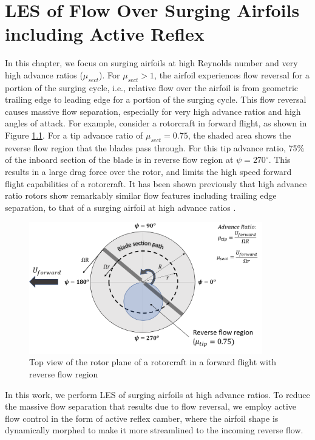 \chapter{LES of Flow Over Surging Airfoils including Active Reflex}

In this chapter, we focus on surging airfoils at high Reynolds number and very high advance ratios ($\mu_{sect}$). For $\mu_{sect}>1$, the airfoil experiences flow reversal for a portion of the surging cycle, i.e., relative flow over the airfoil is from geometric trailing edge to leading edge for a portion of the surging cycle.
This flow reversal causes massive flow separation, especially for very high advance ratios and high angles of attack. 
For example, consider a rotorcraft in forward flight, as shown in Figure \ref{fig:forward_flight_schematic}.
For a tip advance ratio of $\mu_{sect} = 0.75$, the shaded area shows the reverse flow region that the blades pass through.
For this tip advance ratio, 75\% of the inboard section of the blade is in reverse flow region at $\psi=270^\circ$.
This results in a large drag force over the rotor, and limits the high speed forward flight capabilities of a rotorcraft.
It has been shown previously that high advance ratio rotors show remarkably similar flow features including trailing edge separation, to that of a surging airfoil at high advance ratios \cite{bib:kirk_jones_2019}.

\begin{figure}[H]
	\centering
	\texttt{}		\includegraphics[width=4in]{figures/Setup/forward_flight_schematic.png}
	\caption{Top view of the rotor plane of a rotorcraft in a forward flight with reverse flow region}
	\label{fig:forward_flight_schematic}
\end{figure}

In this work, we perform LES of surging airfoils at high advance ratios.
To reduce the massive flow separation that results due to flow reversal, we employ active flow control in the form of active reflex camber, where the airfoil shape is dynamically morphed to make it more streamlined to the incoming reverse flow.

